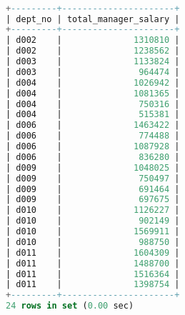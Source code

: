 \documentclass[12pt]{report}
\begin{document}
\begin{lstlisting}[language=sql]

+---------+----------------------+
| dept_no | total_manager_salary |
+---------+----------------------+
| d002    |              1310810 |
| d002    |              1238562 |
| d003    |              1133824 |
| d003    |               964474 |
| d004    |              1026942 |
| d004    |              1081365 |
| d004    |               750316 |
| d004    |               515381 |
| d006    |              1463422 |
| d006    |               774488 |
| d006    |              1087928 |
| d006    |               836280 |
| d009    |              1048025 |
| d009    |               750497 |
| d009    |               691464 |
| d009    |               697675 |
| d010    |              1126227 |
| d010    |               902149 |
| d010    |              1569911 |
| d010    |               988750 |
| d011    |              1604309 |
| d011    |              1488700 |
| d011    |              1516364 |
| d011    |              1398754 |
+---------+----------------------+
24 rows in set (0.00 sec)

\end{lstlisting}
\end{document}
